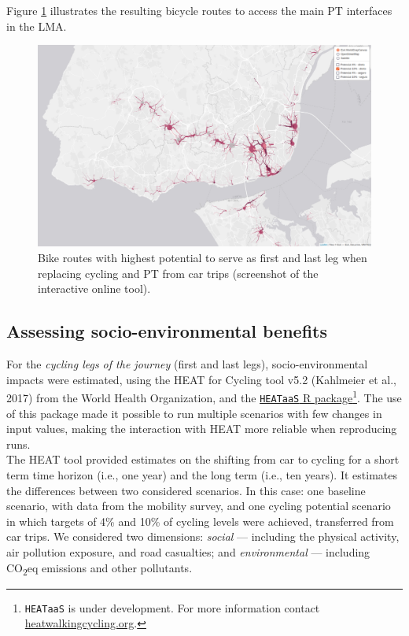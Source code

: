 \documentclass[review, doubleblind, 3p,
authoryear]{elsarticle} %
\begin{document}
Figure \ref{fig:map2} illustrates the resulting bicycle routes to access
the main PT interfaces in the LMA.

\begin{figure}

{\centering \includegraphics[width=0.8\linewidth,]{img/map2} 

}

\caption{Bike routes with highest potential to serve as first and last leg when replacing cycling and PT from car trips (screenshot of the interactive online tool).}\label{fig:map2}
\end{figure}

\hypertarget{assessing-socio-environmental-benefits}{%
\subsection{Assessing socio-environmental
benefits}\label{assessing-socio-environmental-benefits}}

For the \emph{cycling legs of the journey} (first and last legs),
socio-environmental impacts were estimated, using the HEAT for Cycling
tool v5.2 (Kahlmeier et al., 2017) from the World Health Organization,
and the
\href{https://github.com/HEAT-WHO/HEAT_heatr_api}{\texttt{HEATaaS} R
package}\footnote{\texttt{HEATaaS} is under development. For more
  information contact
  \href{https://heatwalkingcycling.org}{heatwalkingcycling.org}.}. The
use of this package made it possible to run multiple scenarios with few
changes in input values, making the interaction with HEAT more reliable
when reproducing runs.\\
The HEAT tool provided estimates on the shifting from car to cycling for
a short term time horizon (i.e., one year) and the long term (i.e., ten
years). It estimates the differences between two considered scenarios.
In this case: one baseline scenario, with data from the mobility survey,
and one cycling potential scenario in which targets of 4\% and 10\% of
cycling levels were achieved, transferred from car trips. We considered
two dimensions: \emph{social} --- including the physical activity, air
pollution exposure, and road casualties; and \emph{environmental} ---
including CO\textsubscript{2}eq emissions and other pollutants.
\end{document}
